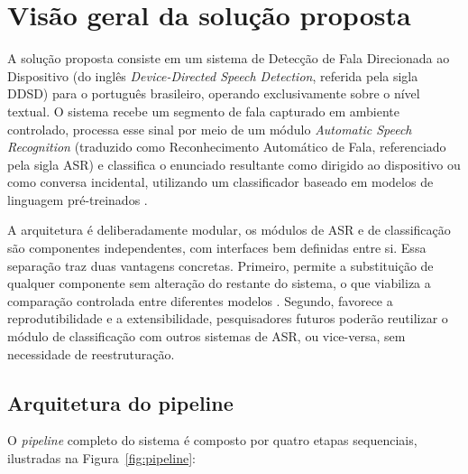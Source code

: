 \documentclass[
    12pt,                %
    openright,           %
    oneside,             %
    a4paper,             %
    english,             %
    brazil               %
]{abntex2}
\begin{document}
\section{Visão geral da solução proposta}
\label{sec:visao_geral}

A solução proposta consiste em um sistema de Detecção de Fala Direcionada ao Dispositivo (do inglês \textit{Device-Directed Speech Detection}, referida pela sigla DDSD) para o português brasileiro, operando exclusivamente sobre o nível textual. O sistema recebe um segmento de fala capturado em ambiente controlado, processa esse sinal por meio de um módulo \textit{Automatic Speech Recognition} (traduzido como Reconhecimento Automático de Fala, referenciado pela sigla ASR) e classifica o enunciado resultante como dirigido ao dispositivo ou como conversa incidental, utilizando um classificador baseado em modelos de linguagem pré-treinados \cite{Dighe2024, Wagner2024}.

A arquitetura é deliberadamente modular, os módulos de ASR e de classificação são componentes independentes, com interfaces bem definidas entre si. Essa separação traz duas vantagens concretas. Primeiro, permite a substituição de qualquer componente sem alteração do restante do sistema, o que viabiliza a comparação controlada entre diferentes modelos \cite{Wazlawick2020}. Segundo, favorece a reprodutibilidade e a extensibilidade, pesquisadores futuros poderão reutilizar o módulo de classificação com outros sistemas de ASR, ou vice-versa, sem necessidade de reestruturação.


\subsection{Arquitetura do pipeline}
\label{sec:pipeline}

O \textit{pipeline} completo do sistema é composto por quatro etapas sequenciais, ilustradas na Figura~\ref{fig:pipeline}:
\end{document}

